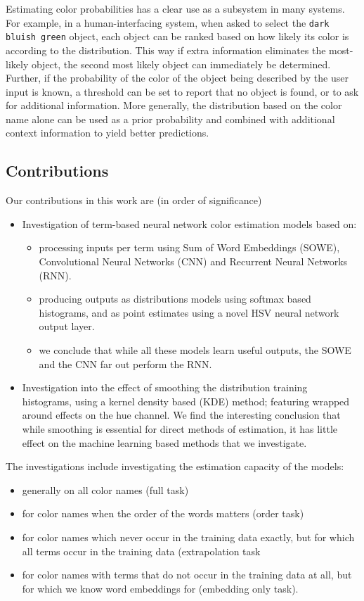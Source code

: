\documentclass[11pt,a4paper]{article}
\begin{document}
Estimating color probabilities has a clear use as a subsystem in many systems.
For example, in a human-interfacing system, when asked to select the \texttt{dark bluish green} object, each object can be ranked based on how likely its color is according to the distribution.
This way if extra information eliminates the most-likely object, the second most likely object can immediately be determined.
Further, if the probability of the color of the object being described by the user input is known, a threshold can be set to report that no object is found, or to ask for additional information.
More generally, the distribution based on the color name alone can be used as a prior probability and combined with additional context information to yield better predictions.

\subsection{Contributions}
Our contributions in this work are (in order of significance)
\begin{itemize}
	\item Investigation of term-based neural network color estimation models based on:
	\begin{itemize}
		\item processing inputs per term using  Sum of Word Embeddings (SOWE), Convolutional Neural Networks (CNN) and Recurrent Neural Networks (RNN).
		\item producing outputs as distributions models using softmax based histograms, and as point estimates using a novel HSV neural network output layer.
		\item we conclude that while all these models learn useful outputs, the SOWE and the CNN far out perform the RNN.
	\end{itemize}
	\item Investigation into the effect of smoothing the distribution training histograms, using a kernel density based (KDE) method; featuring wrapped around effects on the hue channel. We find the interesting conclusion that while smoothing is essential for direct methods of estimation, it has little effect on the machine learning based methods that we investigate.
\end{itemize}
The investigations include investigating the estimation capacity of the models:
\begin{itemize}
	\item generally on all color names (full task)
	\item for color names when the order of the words matters (order task)
	\item for color names which never occur in the training data exactly, but for which all terms occur in the training data (extrapolation task
	\item for color names with terms that do not occur in the training data at all, but for which we know word embeddings for (embedding only task).
\end{itemize}
\end{document}
